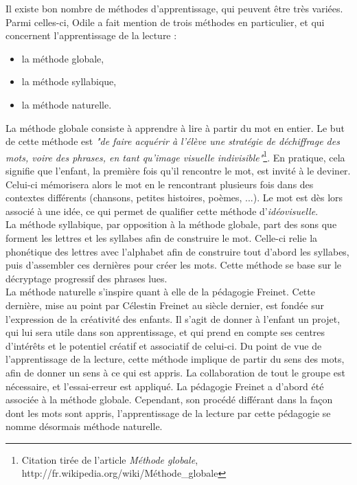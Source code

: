 Il existe bon nombre de méthodes d'apprentissage, qui peuvent être très variées. Parmi celles-ci, Odile a fait mention de trois méthodes en particulier, et qui concernent l'apprentissage de la lecture :
\begin{itemize}
\item la méthode globale,
\item la méthode syllabique,
\item la méthode naturelle.\\
\end{itemize} 

La méthode globale consiste à apprendre à lire à partir du mot en entier. Le but de cette méthode est \textit{"de faire acquérir à l'élève une stratégie de déchiffrage des mots, voire des phrases, en tant qu'image visuelle indivisible"}\footnote{Citation tirée de l'article \textit{Méthode globale}, http://fr.wikipedia.org/wiki/Méthode\_globale}. En pratique, cela signifie que l'enfant, la première fois qu'il rencontre le mot, est invité à le deviner. Celui-ci mémorisera alors le mot en le rencontrant plusieurs fois dans des contextes différents (chansons, petites histoires, poèmes, ...). Le mot est dès lors associé à une idée, ce qui permet de qualifier cette méthode d'\textit{idéovisuelle}.\\

La méthode syllabique, par opposition à la méthode globale, part des sons que forment les lettres et les syllabes afin de construire le mot. Celle-ci relie la phonétique des lettres avec l'alphabet afin de construire tout d'abord les syllabes, puis d'assembler ces dernières pour créer les mots. Cette méthode se base sur le décryptage progressif des phrases lues.\\

La méthode naturelle s'inspire quant à elle de la pédagogie Freinet. Cette dernière, mise au point par Célestin Freinet au siècle dernier, est fondée sur l'expression de la créativité des enfants. Il s'agit de donner à l'enfant un projet, qui lui sera utile dans son apprentissage, et qui prend en compte ses centres d'intérêts et le potentiel créatif et associatif de celui-ci. Du point de vue de l'apprentissage de la lecture, cette méthode implique de partir du sens des mots, afin de donner un sens à ce qui est appris. La collaboration de tout le groupe est nécessaire, et l'essai-erreur est appliqué. La pédagogie Freinet a d'abord été associée à la méthode globale. Cependant, son procédé différant dans la façon dont les mots sont appris, l'apprentissage de la lecture par cette pédagogie se nomme désormais méthode naturelle.\\

